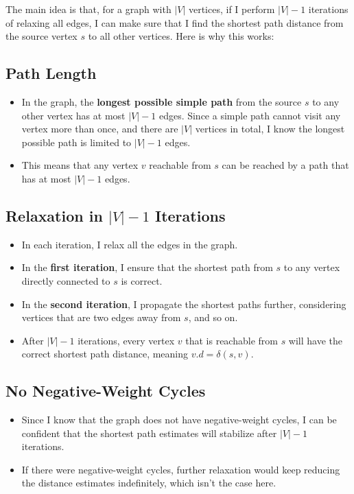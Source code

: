 \documentclass[10pt,letter,notitlepage]{article}
\begin{document}
\begin{Answer}
The main idea is that, for a graph with \( |V| \) vertices, if I perform \textbf{\(|V| - 1\)} iterations of relaxing all edges, I can make sure that I find the shortest path distance from the source vertex \( s \) to all other vertices. Here is why this works:

\subsection*{Path Length}

\begin{itemize}
    \item In the graph, the \textbf{longest possible simple path} from the source \( s \) to any other vertex has at most \( |V| - 1 \) edges. Since a simple path cannot visit any vertex more than once, and there are \( |V| \) vertices in total, I know the longest possible path is limited to \( |V| - 1 \) edges.
    \item This means that any vertex \( v \) reachable from \( s \) can be reached by a path that has at most \( |V| - 1 \) edges.
\end{itemize}

\subsection*{Relaxation in \( |V| - 1 \) Iterations}

\begin{itemize}
    \item In each iteration, I relax all the edges in the graph.
    \item In the \textbf{first iteration}, I ensure that the shortest path from \( s \) to any vertex directly connected to \( s \) is correct.
    \item In the \textbf{second iteration}, I propagate the shortest paths further, considering vertices that are two edges away from \( s \), and so on.
    \item After \textbf{\(|V| - 1\)} iterations, every vertex \( v \) that is reachable from \( s \) will have the correct shortest path distance, meaning \( v.d = \delta(s, v) \).
\end{itemize}

\subsection*{No Negative-Weight Cycles}

\begin{itemize}
    \item Since I know that the graph does not have negative-weight cycles, I can be confident that the shortest path estimates will stabilize after \( |V| - 1 \) iterations.
    \item If there were negative-weight cycles, further relaxation would keep reducing the distance estimates indefinitely, which isn’t the case here.
\end{itemize}


\end{Answer}
\end{document}
